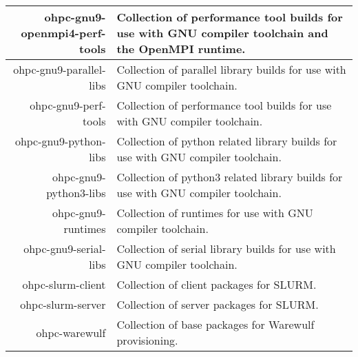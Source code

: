 \begin{tabularx}{\textwidth}{r|X}
\hline
ohpc-gnu9-openmpi4-perf-tools & Collection of performance tool builds for use with GNU compiler toolchain and the OpenMPI runtime. \\ 
\hline
ohpc-gnu9-parallel-libs & Collection of parallel library builds for use with GNU compiler toolchain. \\ 
\hline
ohpc-gnu9-perf-tools & Collection of performance tool builds for use with GNU compiler toolchain. \\ 
\hline
ohpc-gnu9-python-libs & Collection of python related library builds for use with GNU compiler toolchain. \\ 
\hline
ohpc-gnu9-python3-libs & Collection of python3 related library builds for use with GNU compiler toolchain. \\ 
\hline
ohpc-gnu9-runtimes & Collection of runtimes for use with GNU compiler toolchain. \\ 
\hline
ohpc-gnu9-serial-libs & Collection of serial library builds for use with GNU compiler toolchain. \\ 
\hline
ohpc-slurm-client & Collection of client packages for SLURM. \\ 
\hline
ohpc-slurm-server & Collection of server packages for SLURM. \\ 
\hline
ohpc-warewulf & Collection of base packages for Warewulf provisioning. \\ 
\hline
\bottomrule
\end{tabularx}

